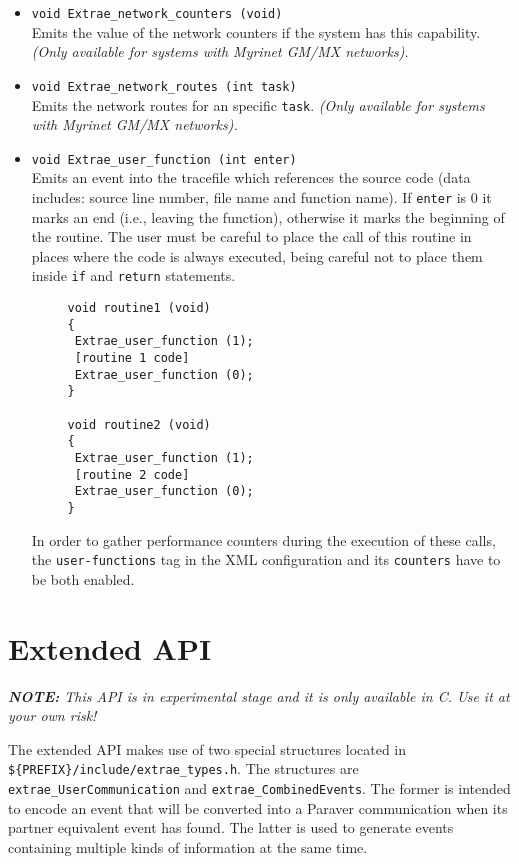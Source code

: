 \begin{itemize}
 \item {\tt void Extrae\_network\_counters (void)}\\
  Emits the value of the network counters if the system has this capability. {\em (Only available for systems with Myrinet GM/MX networks).}

 \item {\tt void Extrae\_network\_routes (int task)}\\
  Emits the network routes for an specific {\tt task}. {\em (Only available for systems with Myrinet GM/MX networks).}

 \item {\tt void Extrae\_user\_function (int enter)}\\
  Emits an event into the tracefile which references the source code (data includes: source line number, file name and function name). If {\tt enter} is 0 it marks an end (i.e., leaving the function), otherwise it marks the beginning of the routine. The user must be careful to place the call of this routine in places where the code is always executed, being careful not to place them inside {\tt if} and {\tt return} statements.
    \begin{verbatim}
     void routine1 (void)
     {
      Extrae_user_function (1);
      [routine 1 code]
      Extrae_user_function (0);
     }

     void routine2 (void)
     {
      Extrae_user_function (1);
      [routine 2 code]
      Extrae_user_function (0);
     }
   \end{verbatim}
   In order to gather performance counters during the execution of these calls, the {\tt user-functions} tag in the XML configuration and its {\tt counters} have to be both enabled.

\end{itemize}

\section{Extended API}\label{sec:ExtendedAPI}

{\em {\bf NOTE:} This API is in experimental stage and it is only available in C. Use it at your own risk!}

The extended API makes use of two special structures located in {\tt \$\{PREFIX\}/include/extrae\_types.h}. The structures are {\tt extrae\_UserCommunication} and {\tt extrae\_CombinedEvents}. The former is intended to encode an event that will be converted into a Paraver communication when its partner equivalent event has found. The latter is used to generate events containing multiple kinds of information at the same time.

